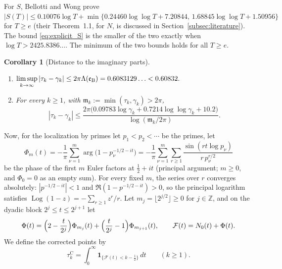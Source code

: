 \documentclass[11pt,a4paper]{article}
\makeatletter
\numberwithin{equation}{section}
\DeclareRobustCommand{\CGref}[1]{\ref{#1}}
\DeclareRobustCommand{\CGeqref}[1]{\eqref{#1}}
\DeclareRobustCommand{\CGcite}[2][]{\if\relax\detokenize{#1}\relax\cite{#2}\else\cite[#1]{#2}\fi}
\let\CG@origref\ref
\let\CG@origeqref\eqref
\newcommand{\CG@gettip}[1]{\@ifundefined{CGTip@#1}{#1}{\csname CGTip@#1\endcsname}}
\newcommand{\CG@getbib}[1]{\@ifundefined{CGBib@#1}{#1}{\csname CGBib@#1\endcsname}}
\DeclareRobustCommand{\CGref}[1]{\pdftooltip{\CG@origref{#1}}{\CG@gettip{#1}}}
\DeclareRobustCommand{\CGeqref}[1]{\pdftooltip{\CG@origeqref{#1}}{\CG@gettip{#1}}}
\DeclareRobustCommand{\CGcite}[2][]{\pdftooltip{\if\relax\detokenize{#1}\relax\cite{#2}\else\cite[#1]{#2}\fi}{\CG@getbib{#2}}}
\newtheorem{corollary}[theorem]{Corollary}
\theoremstyle{definition}
\theoremstyle{remark}
\newcommand{\Nz}{N_0} %
\newcommand{\Fc}{\mathcal F}
\newcommand{\Ph}{\Phi}
\newcommand{\Ind}{\mathbf 1}
\newcommand{\eB}{\mathfrak e_{\rm B}}
\newcommand{\Z}{\mathbb Z}
\makeatother
\begin{document}
\par
For $S$, Bellotti and Wong \CGcite[Cor.~1.5]{BellottiWong2025} prove $|S(T)|\le0.10076\log T+\min\{0.24460\log\log T+7.20844,\,1.68845\log\log T+1.50956\}$ for $T\ge e$ (their Theorem~1.1, for $N$, is discussed in Section~\CGref{subsec:literature}). The bound \CGeqref{eq:explicit_S} is the smaller of the two exactly when $\log T>2425.8386\ldots$. The minimum of the two bounds holds for all $T\ge e$.

\begin{corollary}[Distance to the imaginary parts]\label{cor:distance}
\begin{enumerate}[label=(\alph*)]
\item $\displaystyle\limsup_{k\to\infty}|\tau_k-\gamma_k|\le2\pi\Lambda(\eB)=0.6083129\ldots<0.60832 .$
\item For every $k\ge1$, with $\mathfrak m_k:=\min(\tau_k,\gamma_k)>2\pi$,
\begin{equation}
|\tau_k-\gamma_k|\le\frac{2\pi\bigl(0.09783\log\gamma_k+0.7214\log\log\gamma_k+10.2\bigr)}{\log(\mathfrak m_k/2\pi)} .
\label{eq:distance_explicit}
\end{equation}
\end{enumerate}
\end{corollary}

Now, for the localization by primes let $p_1<p_2<\cdots$ be the primes, let
\begin{equation}
\Ph_m(t)=-\frac1\pi\sum_{\nu=1}^m\arg\bigl(1-p_\nu^{-1/2-it}\bigr)=-\frac1\pi\sum_{\nu=1}^m\sum_{r\ge1}\frac{\sin(rt\log p_\nu)}{r\,p_\nu^{r/2}}
\label{eq:Euler_phase}
\end{equation}
be the phase of the first $m$ Euler factors at $\frac12+it$ (principal argument; $m\ge0$, and $\Ph_0=0$ as an empty sum). For every fixed $m$, the series over $r$ converges absolutely: $|p^{-1/2-it}|<1$ and $\Re(1-p^{-1/2-it})>0$, so the principal logarithm satisfies $\operatorname{Log}(1-z)=-\sum_{r\ge1}z^r/r$. Let $m_j=\lfloor2^{j/2}\rfloor\ge0$ for $j\in\Z$, and on the dyadic block $2^j\le t\le2^{j+1}$ let
\begin{equation}
\Ph(t)=\Bigl(2-\frac t{2^j}\Bigr)\Ph_{m_j}(t)+\Bigl(\frac t{2^j}-1\Bigr)\Ph_{m_{j+1}}(t),\qquad \Fc(t)=\Nz(t)+\Ph(t).
\label{eq:F_def}
\end{equation}
We define the corrected points by
\begin{equation}
\tau_{k}^{\mathrm C}=\int_0^\infty\Ind_{\{\Fc(t)<k-\frac12\}}\,dt\qquad(k\ge1).
\label{eq:xk_def}
\end{equation}
\end{document}
